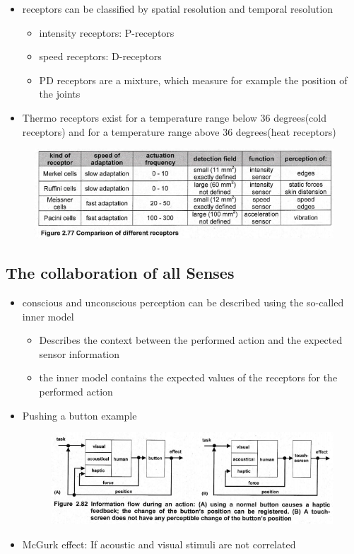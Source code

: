 \documentclass{standalone}
\begin{document}
\begin{itemize}
\begin{itemize}
	\end{itemize}
	\item receptors can be classified by spatial resolution and temporal resolution
	\begin{itemize}
		\item intensity receptors: P-receptors
		\item speed receptors: D-receptors
		\item PD receptors are a mixture, which measure for example the position of the joints
	\end{itemize}
	\item Thermo receptors exist for a temperature range below 36 degrees(cold receptors) and for a temperature range above 36 degrees(heat receptors)
\end{itemize}
	\begin{figure}[H]
			\centering
			\includegraphics[width = 0.7\linewidth]{Figures/2_77.png}
	\end{figure}
\subsection{The collaboration of all Senses}
\begin{itemize}
	\item conscious and unconscious perception can be described using the so-called inner model
	\begin{itemize}
		\item Describes the context between the performed action and the expected sensor information
		\item the inner model contains the expected values of the receptors for the performed action
	\end{itemize}
	\item Pushing a button example
	\begin{figure}[H]
			\centering
			\includegraphics[width = 0.7\linewidth]{Figures/2_82.png}
	\end{figure}
	\item McGurk effect: If acoustic and visual stimuli are not correlated
\end{itemize}
\end{document}
